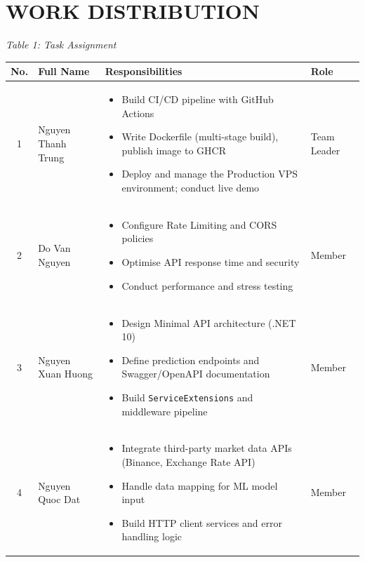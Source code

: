 \documentclass[13pt,a4paper]{article}
\begin{document}
\section*{WORK DISTRIBUTION}

\begin{center}\textit{Table 1: Task Assignment}\end{center}
\begin{tabular}{|c|l|p{7.5cm}|l|}
\hline
\textbf{No.} & \textbf{Full Name} & \textbf{Responsibilities} & \textbf{Role}\\
\hline
1 & Nguyen Thanh Trung &
  \begin{minipage}[t]{7.5cm}
    \begin{itemize}[noitemsep,topsep=2pt]
      \item Build CI/CD pipeline with GitHub Actions
      \item Write Dockerfile (multi-stage build), publish image to GHCR
      \item Deploy and manage the Production VPS environment; conduct live demo
    \end{itemize}
  \end{minipage}
& Team Leader\\
\hline
2 & Do Van Nguyen &
  \begin{minipage}[t]{7.5cm}
    \begin{itemize}[noitemsep,topsep=2pt]
      \item Configure Rate Limiting and CORS policies
      \item Optimise API response time and security
      \item Conduct performance and stress testing
    \end{itemize}
  \end{minipage}
& Member\\
\hline
3 & Nguyen Xuan Huong &
  \begin{minipage}[t]{7.5cm}
    \begin{itemize}[noitemsep,topsep=2pt]
      \item Design Minimal API architecture (.NET 10)
      \item Define prediction endpoints and Swagger/OpenAPI documentation
      \item Build \texttt{ServiceExtensions} and middleware pipeline
    \end{itemize}
  \end{minipage}
& Member\\
\hline
4 & Nguyen Quoc Dat &
  \begin{minipage}[t]{7.5cm}
    \begin{itemize}[noitemsep,topsep=2pt]
      \item Integrate third-party market data APIs (Binance, Exchange Rate API)
      \item Handle data mapping for ML model input
      \item Build HTTP client services and error handling logic
    \end{itemize}
  \end{minipage}
& Member\\
\hline
\end{tabular}
\newpage








\end{document}
